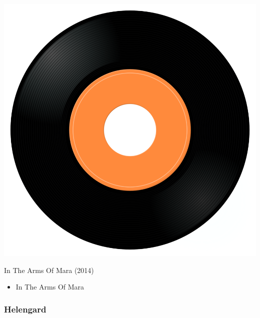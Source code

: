 \begin{minipage}[t]{0.25\textwidth}
\captionsetup{type=figure}
\includegraphics[width=\textwidth]{Images/cover.png}
\caption*{In The Arms Of Mara (2014)}
\end{minipage}
\begin{minipage}[t]{0.25\textwidth}\vspace{0pt}
\begin{itemize}[nosep,leftmargin=1em,labelwidth=*,align=left]
	\setlength{\itemsep}{0pt}
	\item In The Arms Of Mara
\end{itemize}
\end{minipage}

\subsubsection{Helengard}


